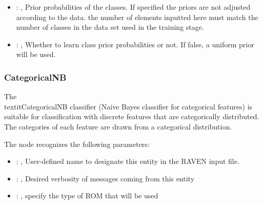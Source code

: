 \begin{itemize}
    \item {}: ,
      Prior probabilities of the classes. If specified the priors are
      not adjusted according to the data. \nb the number of elements inputted here must
      match the number of classes in the data set used in the training stage.

    \item {}: ,
      Whether to learn class prior probabilities or not. If false, a uniform
      prior will be used.
  \end{itemize}


\subsubsection{CategoricalNB}
  The \\textit{CategoricalNB} classifier (Naive Bayes classifier for categorical features)
  is suitable for classification with discrete features that are categorically distributed.
  The categories of each feature are drawn from a categorical distribution.

  The  node recognizes the following parameters:
    \begin{itemize}
      \item {}: ,
        User-defined name to designate this entity in the RAVEN input file.
      \item {}: ,
        Desired verbosity of messages coming from this entity
      \item {}: ,
        specify the type of ROM that will be used
  \end{itemize}


